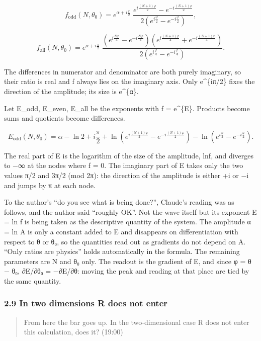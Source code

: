 \documentclass[
  a4paper,
]{article}
\begin{document}
\[
f_{\mathrm{odd}}(N,\theta_0)=e^{\alpha+i\frac{\pi}{2}}\;\frac{e^{i\frac{(N+1)\varphi}{2}}-e^{-i\frac{(N+1)\varphi}{2}}}{2\left(e^{i\frac{\varphi}{2}}-e^{-i\frac{\varphi}{2}}\right)},
\]

\[
f_{\mathrm{all}}(N,\theta_0)=e^{\alpha+i\frac{\pi}{2}}\;\frac{\left(e^{i\frac{N\varphi}{4}}-e^{-i\frac{N\varphi}{4}}\right)\left(e^{i\frac{(N+1)\varphi}{4}}+e^{-i\frac{(N+1)\varphi}{4}}\right)}{2\left(e^{i\frac{\varphi}{4}}-e^{-i\frac{\varphi}{4}}\right)}.
\]

The differences in numerator and denominator are both purely imaginary,
so their ratio is real and f always lies on the imaginary axis. Only
e\^{}\{iπ/2\} fixes the direction of the amplitude; its size is
e\^{}\{α\}.

Let E\_odd, E\_even, E\_all be the exponents with f = e\^{}\{E\}.
Products become sums and quotients become differences.

\[
E_{\mathrm{odd}}(N,\theta_0)=\alpha-\ln2+i\frac{\pi}{2}+\ln\!\left(e^{i\frac{(N+1)\varphi}{2}}-e^{-i\frac{(N+1)\varphi}{2}}\right)-\ln\!\left(e^{i\frac{\varphi}{2}}-e^{-i\frac{\varphi}{2}}\right).
\]

The real part of E is the logarithm of the size of the amplitude,
ln\textbar f\textbar, and diverges to −∞ at the nodes where
\textbar f\textbar{} = 0. The imaginary part of E takes only the two
values π/2 and 3π/2 (mod 2π): the direction of the amplitude is either
+i or −i and jumps by π at each node.

To the author's ``do you see what is being done?'', Claude's reading was
as follows, and the author said ``roughly OK''. Not the wave itself but
its exponent E = ln f is being taken as the descriptive quantity of the
system. The amplitude α = ln A is only a constant added to E and
disappears on differentiation with respect to θ or θ₀, so the quantities
read out as gradients do not depend on A. ``Only ratios are physics''
holds automatically in the formula. The remaining parameters are N and
θ₀ only. The readout is the gradient of E, and since φ = θ − θ₀, ∂E/∂θ₀
= −∂E/∂θ: moving the peak and reading at that place are tied by the same
quantity.

\subsubsection{2.9 In two dimensions R does not
enter}\label{in-two-dimensions-r-does-not-enter}

\begin{quote}
From here the bar goes up. In the two-dimensional case R does not enter
this calculation, does it? (19:00)
\end{quote}
\end{document}
